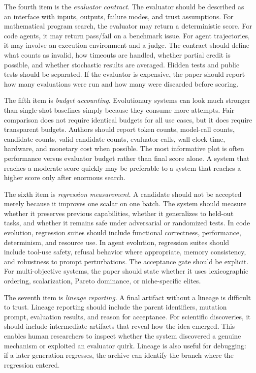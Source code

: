 The fourth item is the \emph{evaluator contract}.  The evaluator should be described as an interface with inputs, outputs, failure modes, and trust assumptions.  For mathematical program search, the evaluator may return a deterministic score.  For code agents, it may return pass/fail on a benchmark issue.  For agent trajectories, it may involve an execution environment and a judge.  The contract should define what counts as invalid, how timeouts are handled, whether partial credit is possible, and whether stochastic results are averaged.  Hidden tests and public tests should be separated.  If the evaluator is expensive, the paper should report how many evaluations were run and how many were discarded before scoring.

The fifth item is \emph{budget accounting}.  Evolutionary systems can look much stronger than single-shot baselines simply because they consume more attempts.  Fair comparison does not require identical budgets for all use cases, but it does require transparent budgets.  Authors should report token counts, model-call counts, candidate counts, valid-candidate counts, evaluator calls, wall-clock time, hardware, and monetary cost when possible.  The most informative plot is often performance versus evaluator budget rather than final score alone.  A system that reaches a moderate score quickly may be preferable to a system that reaches a higher score only after enormous search.

The sixth item is \emph{regression measurement}.  A candidate should not be accepted merely because it improves one scalar on one batch.  The system should measure whether it preserves previous capabilities, whether it generalizes to held-out tasks, and whether it remains safe under adversarial or randomized tests.  In code evolution, regression suites should include functional correctness, performance, determinism, and resource use.  In agent evolution, regression suites should include tool-use safety, refusal behavior where appropriate, memory consistency, and robustness to prompt perturbations.  The acceptance gate should be explicit.  For multi-objective systems, the paper should state whether it uses lexicographic ordering, scalarization, Pareto dominance, or niche-specific elites.

The seventh item is \emph{lineage reporting}.  A final artifact without a lineage is difficult to trust.  Lineage reporting should include the parent identifiers, mutation prompt, evaluation results, and reason for acceptance.  For scientific discoveries, it should include intermediate artifacts that reveal how the idea emerged.  This enables human researchers to inspect whether the system discovered a genuine mechanism or exploited an evaluator quirk.  Lineage is also useful for debugging: if a later generation regresses, the archive can identify the branch where the regression entered.


